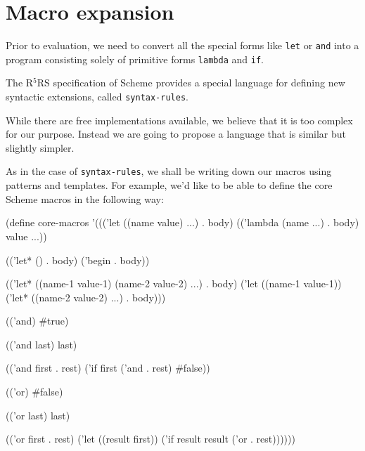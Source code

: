 \chapter{Macro expansion} \label{expander}

Prior to evaluation, we need to convert all the special forms like
\texttt{let} or \texttt{and} into a program consisting solely
of primitive forms \texttt{lambda} and \texttt{if}.

The R$^5$RS specification of Scheme provides a special language
for defining new syntactic extensions, called \texttt{syntax-rules}.

While there are free implementations available, we believe that
it is too complex for our purpose. Instead we are going to propose
a language that is similar but slightly simpler.

As in the case of \texttt{syntax-rules}, we shall be writing down
our macros using patterns and templates. For example, we'd like to
be able to define the core Scheme macros in the following way:

\begin{Snippet}
(define core-macros
  '((('let ((name value) ...)
       . body)
     (('lambda (name ...) . body) value ...))
\end{Snippet}  
\begin{Snippet}
    (('let* () . body)
     ('begin . body))
\end{Snippet}  
\begin{Snippet}    
    (('let* ((name-1 value-1)
	     (name-2 value-2) ...)
       . body)
     ('let ((name-1 value-1))
       ('let* ((name-2 value-2) ...)
         . body)))
\end{Snippet}
\begin{Snippet}
    (('and)
     #true)
\end{Snippet}  
\begin{Snippet}
    (('and last)
     last)
\end{Snippet}  
\begin{Snippet}
    (('and first . rest)
     ('if first ('and . rest) #false))
\end{Snippet}  
\begin{Snippet}
    (('or)
     #false)
\end{Snippet}  
\begin{Snippet}
    (('or last)
     last)
\end{Snippet}  
\begin{Snippet}
    (('or first . rest)
     ('let ((result first))
       ('if result result ('or . rest))))))
\end{Snippet}


